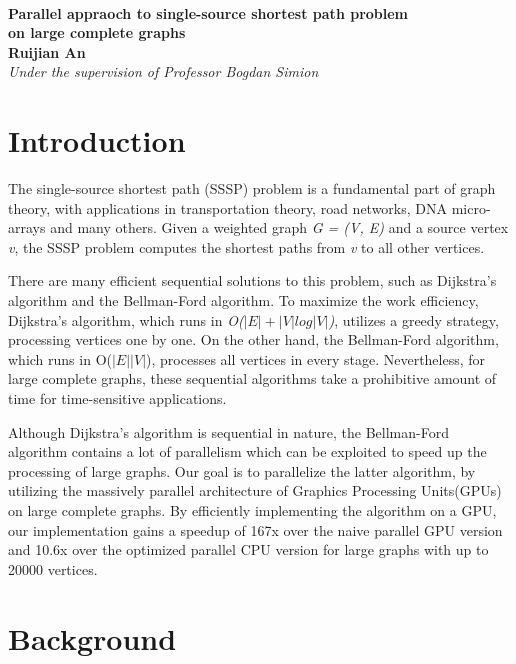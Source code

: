 \documentclass[11pt,a4paper, final, twoside]{article}
\theoremstyle{proposition}
\theoremstyle{definition}
\theoremstyle{remark}
\numberwithin{equation}{section}
\begin{document}



\begin{center}

{\Large \textbf{\\Parallel appraoch to single-source shortest path problem\\on large complete graphs }}\\[5mm]
{\large \textbf{Ruijian An}\\[1mm]}
{\normalsize \emph{Under the supervision of Professor Bogdan Simion}\\[1mm]}
\end{center}


\section{Introduction}\label{I1}
The single-source shortest path (SSSP) problem is a fundamental part of graph theory, with applications in transportation theory, road networks, DNA micro-arrays and many others. Given a weighted graph \emph{G = (V, E)} and a source vertex \emph{v}, the SSSP problem computes the shortest paths from \emph{v} to all other vertices. 

There are many efficient sequential solutions to this problem, such as Dijkstra's algorithm and the Bellman-Ford algorithm\cite{corman}. To maximize the work efficiency, Dijkstra's algorithm, which runs in \emph{O($|E| + |V|log|V|$)}, utilizes a greedy strategy, processing vertices one by one. On the other hand, the Bellman-Ford algorithm, which runs in O(\emph{$|E||V|$}), processes all vertices in every stage. Nevertheless, for large complete graphs, these sequential algorithms take a prohibitive amount of time for time-sensitive applications.

Although Dijkstra's algorithm is sequential in nature, the Bellman-Ford algorithm contains a lot of parallelism which can be exploited to speed up the processing of large graphs. Our goal is to parallelize the latter algorithm, by utilizing the massively parallel architecture of Graphics Processing Units(GPUs) on large complete graphs. By efficiently implementing the algorithm on a GPU, our implementation gains a speedup of 167x over the naive parallel GPU version and 10.6x over the optimized parallel CPU version for large graphs with up to 20000 vertices.
\section{Background}\label{I2}
\end{document}
